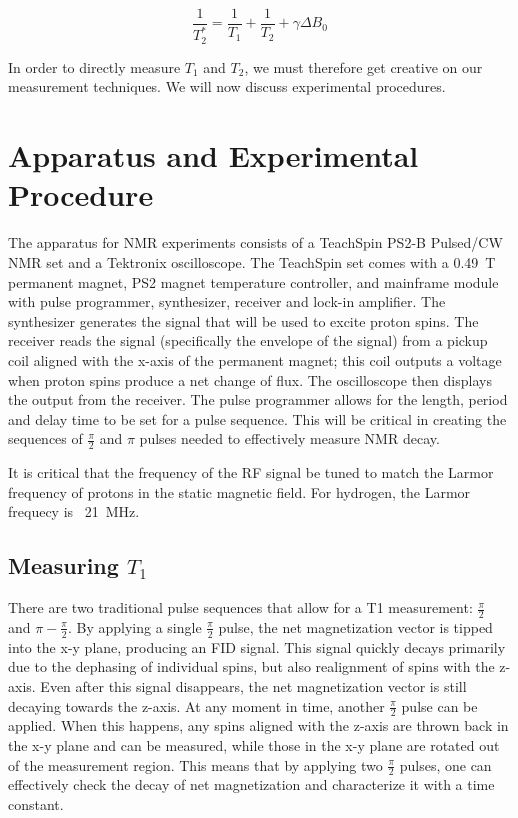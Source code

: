 \documentclass[%
 reprint,
 amsmath,amssymb,
 aps,
]{revtex4-2}
\newcommand{\halfpi}{\frac{\pi}{2}}
\begin{document}
\begin{equation}
    \frac{1}{T_2^*} = \frac{1}{T_1}+\frac{1}{T_2}+ \gamma \Delta B_0
\end{equation}

In order to directly measure $T_1$ and $T_2$, we must therefore get creative on our measurement techniques. We will now discuss experimental procedures. 

\section{Apparatus and Experimental Procedure}

The apparatus for NMR experiments consists of a TeachSpin PS2-B Pulsed/CW NMR set and a Tektronix oscilloscope. The TeachSpin set comes with a \SI{0.49}{\tesla} permanent magnet, PS2 magnet temperature controller, and mainframe module with pulse programmer, synthesizer, receiver and lock-in amplifier. The synthesizer generates the signal that will be used to excite proton spins. The receiver reads the signal (specifically the envelope of the signal) from a pickup coil aligned with the x-axis of the permanent magnet; this coil outputs a voltage when proton spins produce a net change of flux. The oscilloscope then displays the output from the receiver. The pulse programmer allows for the length, period and delay time to be set for a pulse sequence. This will be critical in creating the sequences of $\halfpi$ and $\pi$ pulses needed to effectively measure NMR decay. 

It is critical that the frequency of the RF signal be tuned to match the Larmor frequency of protons in the static magnetic field. For hydrogen, the Larmor frequecy is ~\SI{21}{\mega\hertz}. 

\subsection{Measuring $T_1$ \label{sec:measure-t1}}

There are two traditional pulse sequences that allow for a T1 measurement: $\halfpi$ and $\pi-\halfpi$. By applying a single $\halfpi$ pulse, the net magnetization vector is tipped into the x-y plane, producing an FID signal. This signal quickly decays primarily due to the dephasing of individual spins, but also realignment of spins with the z-axis. Even after this signal disappears, the net magnetization vector is still decaying towards the z-axis. At any moment in time, another $\halfpi$ pulse can be applied. When this happens, any spins aligned with the z-axis are thrown back in the x-y plane and can be measured, while those in the x-y plane are rotated out of the measurement region. This means that by applying two $\halfpi$ pulses, one can effectively check the decay of net magnetization and characterize it with a time constant. 
\end{document}
